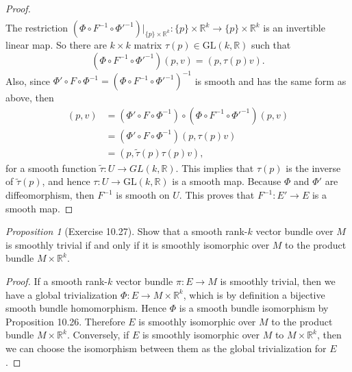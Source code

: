 \documentclass[a4paper]{article}
\theoremstyle{remark}
\newtheorem{prop}{Proposition}
\newcommand{\er}{\mathbb{R}} %
\newcommand{\rk}{\mathbb{R}^k} %
\newcommand{\GLsaja}{\text{GL}} %
\begin{document}
\begin{proof}
\begin{align*}
\end{align*}
The restriction $(\Phi \circ F^{-1} \circ \Phi'^{-1})|_{\{p\} \times \rk} : \{p\} \times \rk \to \{p\} \times \rk$ is an invertible linear map. So there are $k\times k$ matrix $\tau(p) \in \GLsaja(k,\er)$ such that   
$$
(\Phi \circ F^{-1} \circ \Phi'^{-1}) (p,v) = (p, \tau(p)v).
$$
Also, since $\Phi' \circ F \circ \Phi^{-1} = (\Phi \circ F^{-1} \circ \Phi'^{-1})^{-1}$ is smooth and has the same form as above, then
\begin{align*}
(p,v) &= (\Phi' \circ F \circ \Phi^{-1}) \circ (\Phi \circ F^{-1} \circ \Phi'^{-1}) (p,v)\\ &= (\Phi' \circ F \circ \Phi^{-1}) (p,\tau(p)v)\\ &= (p, \widetilde{\tau}(p) \tau(p) v),
\end{align*}
for a smooth function $\widetilde{\tau} :U \to GL(k,\er)$. This implies that $\tau(p)$ is the inverse of $\widetilde{\tau}(p)$, and hence $\tau : U \to \GLsaja(k,\er)$ is a smooth map. Because $\Phi$ and $\Phi'$ are diffeomorphism, then $F^{-1}$ is smooth on $U$. This proves that $F^{-1}: E' \to E$ is a smooth map.
\end{proof}

\begin{prop}[Exercise 10.27]
Show that a smooth rank-$k$ vector bundle over $M$ is smoothly trivial if and only if it is smoothly isomorphic over $M$ to the product bundle $M \times \rk$.
\end{prop}
\begin{proof}
If a smooth rank-$k$ vector bundle $\pi : E \to M$ is smoothly trivial, then we have a global trivialization $\Phi : E \to M\times \rk$, which is by definition a bijective smooth bundle homomorphism. Hence $\Phi$ is a smooth bundle isomorphism by Proposition 10.26. Therefore $E$ is smoothly isomorphic over $M$ to the product bundle $M \times \rk$. Conversely, if $E$ is smoothly isomorphic over $M$ to $M \times \rk$, then we can choose the isomorphism between them as the global trivialization for $E$.
\end{proof}
\end{document}
